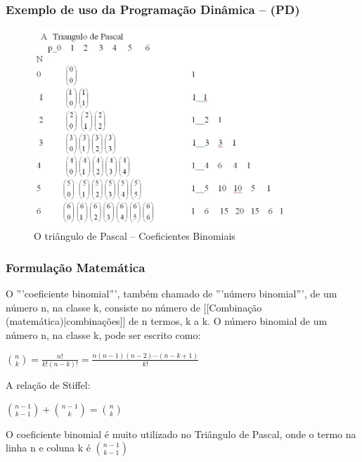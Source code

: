 \begin{frame}[fragile]

\frametitle{Exemplo de uso da Programação Dinâmica -- (PD)}

\begin{figure}[!htb]
\centering
\includegraphics[width=0.850\textwidth, height=0.650\textheight]{figures/pascal_triangle_02.jpg}
\caption{O triângulo de Pascal -- Coeficientes Binomiais}
\end{figure}

    
\end{frame}



\begin{frame}[fragile]

\frametitle{Formulação Matemática}

O '''coeficiente binomial''', também chamado de '''número binomial''', de um número n, na classe k, consiste no número de [[Combinação (matemática)|combinações]] de n termos, k a k. O número binomial de um número n, na classe k, pode ser escrito como:

$ {n \choose k}= \frac {n!}{k!(n-k)!}=\frac {n(n-1)(n-2)\cdots(n-k+1)}{k!}$


A relação de Stiffel:

${n-1\choose k-1}+{n-1\choose k}={n\choose k}$
    
 O coeficiente binomial é muito utilizado no Triângulo de Pascal, onde o termo na linha n e coluna k é ${n-1 \choose k-1}$
   
    
\end{frame}




